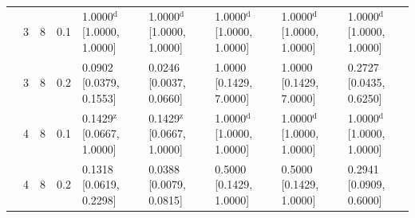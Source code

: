 \begin{tabular}{@{}cccclllll@{}}
 & 3 & 8 & 0.1 & 1.0000$^{\mathrm{d}}$ {\tiny[1.0000, 1.0000]} & 1.0000$^{\mathrm{d}}$ {\tiny[1.0000, 1.0000]} & 1.0000$^{\mathrm{d}}$ {\tiny[1.0000, 1.0000]} & 1.0000$^{\mathrm{d}}$ {\tiny[1.0000, 1.0000]} & 1.0000$^{\mathrm{d}}$ {\tiny[1.0000, 1.0000]} \\
 & 3 & 8 & 0.2 & 0.0902 {\tiny[0.0379, 0.1553]} & 0.0246 {\tiny[0.0037, 0.0660]} & 1.0000 {\tiny[0.1429, 7.0000]} & 1.0000 {\tiny[0.1429, 7.0000]} & 0.2727 {\tiny[0.0435, 0.6250]} \\
 & 4 & 8 & 0.1 & 0.1429$^{\mathrm{z}}$ {\tiny[0.0667, 1.0000]} & 0.1429$^{\mathrm{z}}$ {\tiny[0.0667, 1.0000]} & 1.0000$^{\mathrm{d}}$ {\tiny[1.0000, 1.0000]} & 1.0000$^{\mathrm{d}}$ {\tiny[1.0000, 1.0000]} & 1.0000$^{\mathrm{d}}$ {\tiny[1.0000, 1.0000]} \\
 & 4 & 8 & 0.2 & 0.1318 {\tiny[0.0619, 0.2298]} & 0.0388 {\tiny[0.0079, 0.0815]} & 0.5000 {\tiny[0.1429, 1.0000]} & 0.5000 {\tiny[0.1429, 1.0000]} & 0.2941 {\tiny[0.0909, 0.6000]} \\
\bottomrule
\end{tabular}
